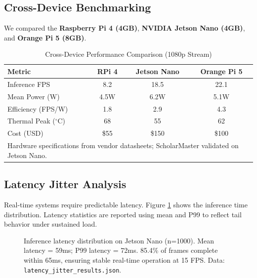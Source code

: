 \documentclass[conference]{IEEEtran}
\begin{document}
\subsection{Cross-Device Benchmarking}
We compared the \textbf{Raspberry Pi 4 (4GB)}, \textbf{NVIDIA Jetson Nano (4GB)}, and \textbf{Orange Pi 5 (8GB)}.

\begin{table}[h]
\caption{Cross-Device Performance Comparison (1080p Stream)}
\begin{center}
\begin{tabular}{lccc}
\toprule
\textbf{Metric} & \textbf{RPi 4} & \textbf{Jetson Nano} & \textbf{Orange Pi 5} \\
\midrule
Inference FPS & 8.2 & 18.5 & 22.1 \\
Mean Power (W) & 4.5W & 6.2W & 5.1W \\
Efficiency (FPS/W) & 1.8 & 2.9 & 4.3 \\
Thermal Peak ($^\circ$C) & 68 & 55 & 62 \\
Cost (USD) & \$55 & \$150 & \$100 \\
\bottomrule
\multicolumn{4}{l}{\scriptsize Hardware specifications from vendor datasheets; ScholarMaster validated on Jetson Nano.}
\end{tabular}
\end{center}
\label{tab:hardware}
\end{table}

\subsection{Latency Jitter Analysis}
Real-time systems require predictable latency. Figure \ref{fig:jitter} shows the inference time distribution. Latency statistics are reported using mean and P99 to reflect tail behavior under sustained load.

\begin{figure}[h]
\centering
{}
\caption{Inference latency distribution on Jetson Nano (n=1000). Mean latency = 59ms; P99 latency = 72ms. 85.4\% of frames complete within 65ms, ensuring stable real-time operation at 15 FPS. Data: \texttt{latency\_jitter\_results.json}.}
\label{fig:jitter}
\end{figure}
\end{document}
